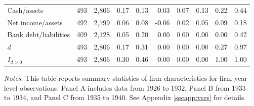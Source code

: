 \begin{table}[p]
\begin{tabular}{lrrrrrrrrr}
Cash/assets                 & 493 & 2,806 & 0.17 & 0.13 &  0.03 &  0.07 &  0.13 &  0.22 & 0.44 \\
Net income/assets           & 492 & 2,799 & 0.06 & 0.08 & -0.06 &  0.02 &  0.05 &  0.09 & 0.18 \\
Bank debt/liabilities       & 409 & 2,128 & 0.05 & 0.20 &  0.00 &  0.00 &  0.00 &  0.00 & 0.42 \\
$d$                         & 493 & 2,806 & 0.17 & 0.31 &  0.00 &  0.00 &  0.00 &  0.27 & 0.97 \\
$I_{d>0}$                   & 493 & 2,806 & 0.30 & 0.46 &  0.00 &  0.00 &  0.00 &  1.00 & 1.00 \\
\bottomrule
\end{tabular}

\vspace*{3mm} \justifying \noindent
\scriptsize{\textit{Notes.} This table reports summary statistics of firm characteristics for firm-year level observations. Panel A includes data from 1926 to 1932, Panel B from 1933 to 1934, and Panel C from 1935 to 1940. See Appendix \ref{secapp:vars} for details.}
\end{table}